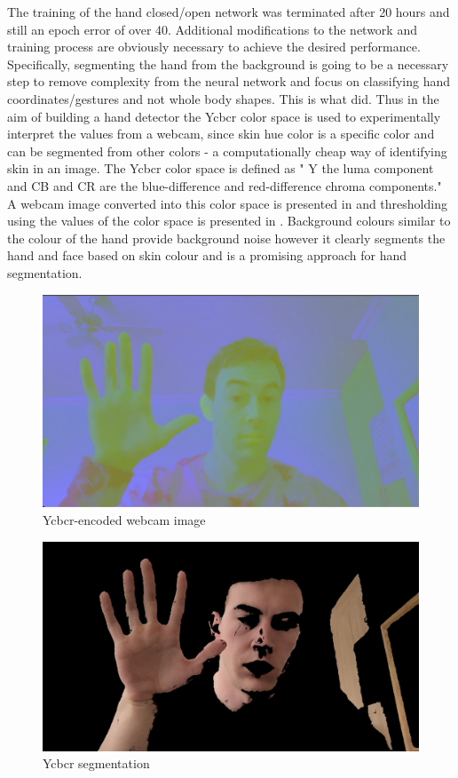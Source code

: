 The training of the hand closed/open network was terminated after 20 hours and still an epoch error of over 40. Additional modifications to the network and training process are obviously necessary to achieve the desired performance. Specifically, segmenting the hand from the background is going to be a necessary step to remove complexity from the neural network and focus on classifying hand coordinates/gestures and not whole body shapes. This is what \cite{mediapipe_hands} did. Thus in the aim of building a hand detector the Ycbcr color space is used to experimentally interpret the values from a webcam, since skin hue color is a specific color and can be segmented from other colors - a computationally cheap way of identifying skin in an image. The Ycbcr color space is defined as " Y the luma component and CB and CR are the blue-difference and red-difference chroma components." A webcam image converted into this color space is presented in  and thresholding using the values of the color space is presented in . Background colours similar to the colour of the hand provide background noise however it clearly segments the hand and face based on skin colour and is a promising approach for hand segmentation.

\begin{figure}[h]
    \centering
    \includegraphics[width=0.7\linewidth]{figures/Ycbcr_hands.png}
    \caption{Ycbcr-encoded webcam image}
    \label{fig:Ycbcr_hands.png}
\end{figure}

\begin{figure}[h]
    \centering
    \includegraphics[width=0.7\linewidth]{figures/Ycbcr_segmentation.png}
    \caption{Ycbcr segmentation}
    \label{fig:Ycbcr_segmentation}
\end{figure}


